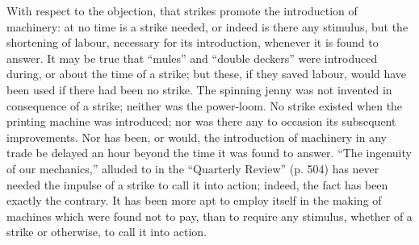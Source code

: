 With respect to the objection, that strikes promote the introduction of
machinery: at no time is a strike needed, or indeed is there any
stimulus, but the shortening of labour, necessary for its introduction,
whenever it is found to answer. It may be true that ``mules'' and
``double deckers'' were introduced during, or about the time of a
strike; but these, if they saved labour, would have been used if there
had been no strike. The spinning jenny was not invented in consequence
of a strike; neither was the power-loom. No strike existed when the
printing machine was introduced; nor was there any to occasion its
subsequent improvements. Nor has been, or would, the introduction of
machinery in any trade be delayed an hour beyond the time it was found
to answer. ``The ingenuity of our mechanics,'' alluded to in the
``Quarterly Review'' (p. 504) has never needed the impulse of a strike
to call it into action; indeed, the fact has been exactly the contrary.
It has been more apt to employ itself in the making of machines which
were found not to pay, than to require any stimulus, whether of a strike
or otherwise, to call it into action.

